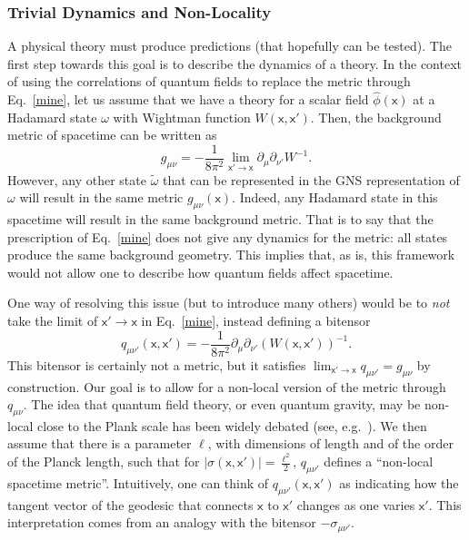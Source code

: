 \documentclass[letterpaper,12pt,titlepage,oneside,final]{book}
\newcommand{\mf}{\mathsf}%
\begin{document}
\subsubsection*{Trivial Dynamics and Non-Locality}

A physical theory must produce predictions (that hopefully can be tested). The first step towards this goal is to describe the dynamics of a theory. In the context of using the correlations of quantum fields to replace the metric through Eq.~\eqref{mine}, let us assume that we have a theory for a scalar field $\hat{\phi}(\mf x)$ at a Hadamard state $\omega$ with Wightman function $W(\mf x, \mf x')$. Then, the background metric of spacetime can be written as
\begin{equation}
    g_{\mu\nu} = - \frac{1}{8\pi^2} \lim_{\mf x' \to \mf x} \partial_\mu \partial_{\nu'}W^{-1}.
\end{equation}
However, any other state $\tilde{\omega}$ that can be represented in the GNS representation of $\omega$ will result in the same metric $g_{\mu\nu}(\mf x)$. Indeed, any Hadamard state in this spacetime will result in the same background metric. That is to say that the prescription of Eq.~\eqref{mine} does not give any dynamics for the metric: all states produce the same background geometry. This implies that, as is, this framework would not allow one to describe how quantum fields affect spacetime.

One way of resolving this issue (but to introduce many others) would be to \textit{not} take the limit of $\mf x' \to \mf x$ in Eq.~\eqref{mine}, instead defining a bitensor
\begin{equation}\label{eq:qnonlocal}
    q_{\mu\nu'}(\mf x, \mf x') =  - \frac{1}{8\pi^2} \partial_\mu \partial_{\nu'}(W(\mf x, \mf x'))^{-1}.
\end{equation}
This bitensor is certainly not a metric, but it satisfies $\lim_{\mf x' \to \mf x}q_{\mu\nu'} = g_{\mu\nu}$ by construction. Our goal is to allow for a non-local version of the metric through $q_{\mu\nu}$. The idea that quantum field theory, or even quantum gravity, may be non-local close to the Plank scale has been widely debated (see, e.g.~\cite{nonlocal1995,nonlocal2011,nonlocal2024}). We then assume that there is a parameter $\ell$, with dimensions of length and of the order of the Planck length, such that for $|\sigma(\mf x,\mf x')| = \tfrac{\ell^2}{2}$, $q_{\mu\nu'}$ defines a ``non-local spacetime metric''. Intuitively, one can think of $q_{\mu\nu'}(\mf x, \mf x')$ as indicating how the tangent vector of the geodesic that connects $\mf x$ to $\mf x'$ changes as one varies $\mf x'$. This interpretation comes from an analogy with the bitensor $- \sigma_{\mu\nu'}$.
\end{document}

